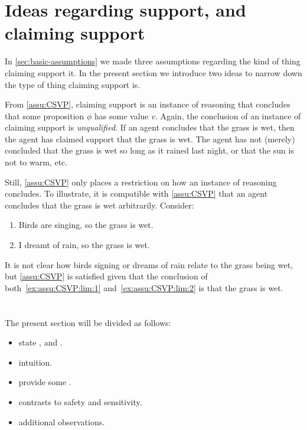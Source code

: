 \section{Ideas regarding support, and claiming support}
\label{sec:two-ideas}

\begin{note}
    In \autoref{sec:basic-assumptions} we made three assumptions regarding the kind of thing claiming support it.
  In the present section we introduce two ideas to narrow down the type of thing claiming support is.
\end{note}

\begin{note}
  From \autoref{assu:CSVP}, claiming support is an instance of reasoning that concludes that some proposition \(\phi\) has some value \(v\).
  Again, the conclusion of an instance of claiming support is \emph{unqualified}.
  If an agent concludes that the grass is wet, then the agent has claimed support that the grass is wet.
  The agent has not (merely) concluded that the grass is wet so long as it rained last night, or that the sun is not to warm, etc.\

  Still, \autoref{assu:CSVP} only places a restriction on how an instance of reasoning concludes.
  To illustrate, it is compatible with \autoref{assu:CSVP} that an agent concludes that the grass is wet arbitrarily.
  Consider:
  \begin{enumerate}
  \item\label{ex:assu:CSVP:lim:1} Birds are singing, so the grass is wet.
  \item\label{ex:assu:CSVP:lim:2} I dreamt of rain, so the grass is wet.
  \end{enumerate}
  It is not clear how birds signing or dreams of rain relate to the grass being wet, but \autoref{assu:CSVP} is satisfied given that the conclusion of both~\ref{ex:assu:CSVP:lim:1} and~\ref{ex:assu:CSVP:lim:2} is that the grass is wet.
\end{note}

\section{}
\label{sec:ideaS}

\begin{note}
  The present section will be divided as follows:
  \begin{itemize}
  \item state \ideaS{}, and \sink{}.
  \item intuition.
  \item provide some .
  \item contrasts to safety and sensitivity.
  \item additional observations.
  \end{itemize}
\end{note}

